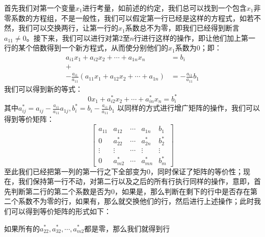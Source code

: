 \documentclass[a4paper,12pt]{ctexart}
\begin{document}
	\indent
	首先我们对第一个变量$x_1$进行考量，如前述的约定，我们总可以找到一个包含$x_1$非零系数的方程组，不是一般性，我们可以假定第一行已经是这样的方程式，如若不然，我们可以交换两行，让第一行的$x_1$系数总不为零，即我们已经得到断言$a_11 \neq 0$。接下来，我们可以进行对第2至$n$行进行这样的操作，即让他们加上第一行的某个倍数得到一个新方程式，从而使分别他们的$x_1$系数为0；即：
	\begin{align*}
	a_{i1}x_1+a_{i2}x_2 + \cdots + a_{1n}x_n &= b_i\\
	+\\
	-\frac{a_{i1}}{a_{11}}(a_{11}x_1+a_{12}x_2+\cdots+a_{1n}) &= -\frac{a_{i1}}{a_{11}}b_1
	\end{align*}
	我们可以得到新的等式：
	$$
	0{x_1}+a_{i2}^*x_2+\cdots+a_{in}^*x_n = b_i^*
	$$
	其中$a_{ij}^*=a_{ij}-\frac{a_{i1}}{a_{11}}a_{1j},b_i^*=b_i-\frac{a_{i1}}{a_{11}}b_1$
	以同样的方式进行增广矩阵的操作，我们可以得到等价矩阵：
	$$
		\left[
		\begin{array}{ccccc}
		a_{11} 	& a_{12} & \cdots & a_{1n} & b_1 \\
		0 		& a_{22}^* & \cdots & a_{2n}^* & b_2^* \\
		\vdots 	& \vdots & \cdots & \vdots & \vdots\\
		0 		& a_{m2}^* & \cdots & a_{mn}^* & b_m^*
		\end{array}
		\right]
	$$
	至此我们已经把第一列的第一行之下全部变为0，同时保证了矩阵的等价性；现在，我们保持第一行不动，对第二行以及之后的所有行执行同样的操作，意即，首先判断第二行的第二个系数是否为0，如果是，那么判断在剩下的行中是否存在第二个系数不为零的行，如果有，那么就交换他们的行，然后进行上述操作；此时我们可以得到等价矩阵的形式如下：
	
	如果所有的$a_{22}^*,a_{32}^*,\cdots,a_{m2}^*$都是零，那么我们就得到行
\end{document}

